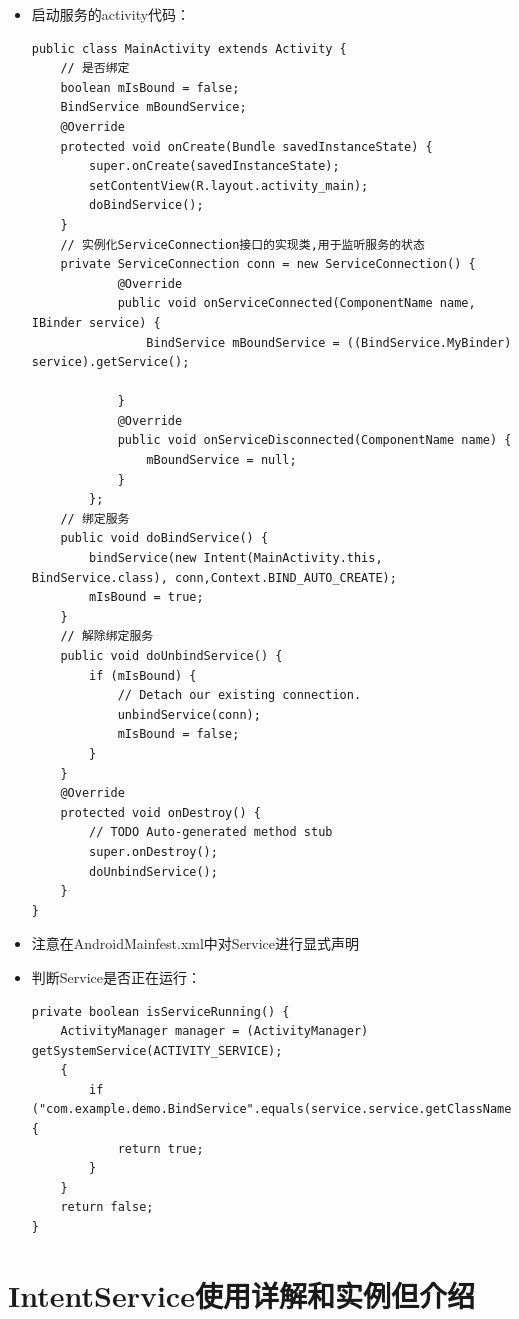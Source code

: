 \documentclass[9pt, b5paper]{article}
\begin{document}
\begin{itemize}
\begin{verbatim}
    public class MyBinder extends Binder{
        public BindService getService(){
            return BindService.this;
        }
    }
    @Override
    public boolean onUnbind(Intent intent) {
        // TODO Auto-generated method stub
        return super.onUnbind(intent);
    }
}
\end{verbatim}
\item 启动服务的activity代码：
\begin{verbatim}
public class MainActivity extends Activity {
    // 是否绑定 
    boolean mIsBound = false; 
    BindService mBoundService;
    @Override
    protected void onCreate(Bundle savedInstanceState) {
        super.onCreate(savedInstanceState);
        setContentView(R.layout.activity_main);
        doBindService();
    }
    // 实例化ServiceConnection接口的实现类,用于监听服务的状态
    private ServiceConnection conn = new ServiceConnection() {  
            @Override  
            public void onServiceConnected(ComponentName name, IBinder service) {  
                BindService mBoundService = ((BindService.MyBinder) service).getService();  
            
            }  
            @Override  
            public void onServiceDisconnected(ComponentName name) {  
                mBoundService = null;  
            }  
        }; 
    // 绑定服务 
    public void doBindService() {  
        bindService(new Intent(MainActivity.this, BindService.class), conn,Context.BIND_AUTO_CREATE);  
        mIsBound = true;  
    }  
    // 解除绑定服务
    public void doUnbindService() {  
        if (mIsBound) {  
            // Detach our existing connection.  
            unbindService(conn);  
            mIsBound = false;  
        }  
    } 
    @Override
    protected void onDestroy() {
        // TODO Auto-generated method stub
        super.onDestroy();
        doUnbindService();
    }
}
\end{verbatim}
\item 注意在AndroidMainfest.xml中对Service进行显式声明
\item 判断Service是否正在运行：
\begin{verbatim}
private boolean isServiceRunning() {
    ActivityManager manager = (ActivityManager) getSystemService(ACTIVITY_SERVICE);
    {
        if ("com.example.demo.BindService".equals(service.service.getClassName())) {
            return true;
        }
    }
    return false;
}
\end{verbatim}
\end{itemize}
\section{IntentService使用详解和实例但介绍}
\label{sec-4}
\end{document}
